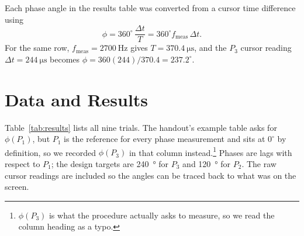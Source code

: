 \documentclass[11pt]{article}
\begin{document}
Each phase angle in the results table was converted from a cursor time
difference using
\[
    \phi = 360^{\circ}\,\frac{\Delta t}{T} = 360^{\circ} f_{\text{meas}}\,\Delta t .
\]
For the same row, $f_{\text{meas}} = \qty{2700}{\hertz}$ gives
$T = \qty{370.4}{\micro\second}$, and the $P_3$ cursor reading
$\Delta t = \qty{244}{\micro\second}$ becomes
$\phi = 360(244)/370.4 = 237.2^{\circ}$.

\section*{Data and Results}
Table~\ref{tab:results} lists all nine trials. The handout's example table asks
for $\phi(P_1)$, but $P_1$ is the reference for every phase measurement and sits
at $0^{\circ}$ by definition, so we recorded $\phi(P_3)$ in that column
instead.\footnote{$\phi(P_3)$ is what the procedure actually asks to measure, so
we read the column heading as a typo.} Phases are lags with respect to $P_1$;
the design targets are \qty{240}{\degree} for $P_3$ and \qty{120}{\degree} for
$P_2$. The raw cursor readings are included so the angles can be traced back to
what was on the screen.
\end{document}
